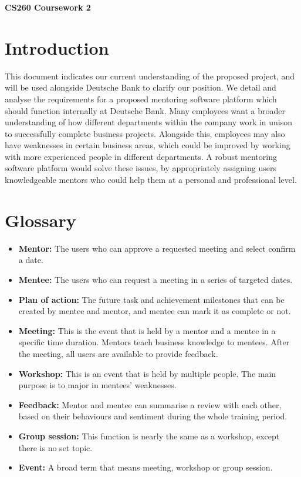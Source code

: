 \documentclass[10pt]{article}
\begin{document}
\begin{center}
    \Huge\textbf{CS260 Coursework 2}\\
\end{center}


\vspace{-6mm}\section{Introduction}\vspace{-2mm}
This document indicates our current understanding of the proposed project, and
will be used alongside Deutsche Bank to clarify our position. We detail and
analyse the requirements for a proposed mentoring software platform which should
function internally at Deutsche Bank. Many employees want a broader
understanding of how different departments within the company work in unison to
successfully complete business projects. Alongside this, employees may also have
weaknesses in certain business areas, which could be improved by working with
more experienced people in different departments. A robust mentoring software
platform would solve these issues, by appropriately assigning users
knowledgeable mentors who could help them at a personal and professional level.

\vspace{-4mm}\section{Glossary}\vspace{-2mm}
\begin{itemize}[leftmargin=1.2cm,noitemsep,align=left]
    \item
        \textbf{Mentor:} The users who can approve a requested meeting and
        select confirm a date.
    \item
        \textbf{Mentee:} The users who can request a meeting in a series of
        targeted dates.
    \item
        \textbf{Plan of action:} The future task and achievement milestones that
        can be created by mentee and mentor, and mentee can mark it as complete
        or not.
    \item
        \textbf{Meeting:} This is the event that is held by a mentor and a mentee
        in a specific time duration. Mentors teach business knowledge to
        mentees. After the meeting, all users are available to provide feedback.
    \item
        \textbf{Workshop:} This is an event that is held by multiple people. The
        main purpose is to major in mentees' weaknesses.
    \item
        \textbf{Feedback:} Mentor and mentee can summarise a review with each
        other, based on their behaviours and sentiment during the whole training
        period.
    \item
        \textbf{Group session:} This function is nearly the same as a workshop,
        except there is no set topic.
    \item
        \textbf{Event:} A broad term that means meeting, workshop or group session.
\end{itemize}
\end{document}
